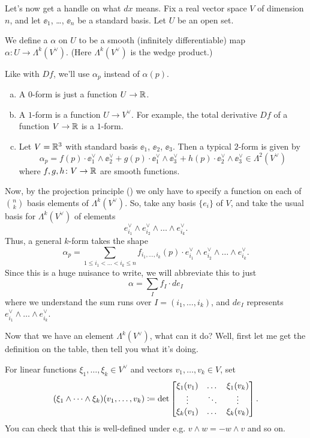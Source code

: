 Let's now get a handle on what $dx$ means.
Fix a real vector space $V$ of dimension $n$,
and let $\ee_1$, \dots, $\ee_n$ be a standard basis.
Let $U$ be an open set.

\begin{definition}
	We define a  $\alpha$ on $U$
	to be a smooth (infinitely differentiable) map
	$\alpha \colon U \to \Lambda^k(V^\vee)$.
	(Here $\Lambda^k(V^\vee)$ is the wedge product.)
\end{definition}

Like with $Df$, we'll use $\alpha_p$ instead of $\alpha(p)$.

\begin{example}
	[$k$-forms for $k=0,1$]
	\listhack
	\begin{enumerate}[(a)]
		\item A $0$-form is just a function $U \to \mathbb R$.
		\item A $1$-form is a function $U \to V^\vee$.
		For example,
		the total derivative $Df$ of a function $V \to \mathbb R$ is a $1$-form.
		\item Let $V = \mathbb R^3$ with standard basis $\ee_1$, $\ee_2$, $\ee_3$.
		Then a typical $2$-form is given by
		\[
			\alpha_p
			=
			f(p) \cdot \ee_1^\vee \wedge \ee_2^\vee
			+ g(p) \cdot \ee_1^\vee \wedge \ee_3^\vee
			+ h(p) \cdot \ee_2^\vee \wedge \ee_3^\vee
			\in \Lambda^2(V^\vee)
		\]
		where $f,g,h \colon V \to \mathbb R$ are smooth functions.
	\end{enumerate}
\end{example}

Now, by the projection principle () we only have to specify
a function on each of $\binom nk$ basis elements of $\Lambda^k(V^\vee)$.
So, take any basis $\{e_i\}$ of $V$, and
take the usual basis for $\Lambda^k(V^\vee)$ of elements
\[ e_{i_1}^\vee \wedge e_{i_2}^\vee \wedge \dots \wedge e_{i_k}^\vee. \]
Thus, a general $k$-form takes the shape
\[ \alpha_p = \sum_{1 \le i_1 < \dots < i_k \le n}
	f_{i_1, \dots, i_k}(p) \cdot
	e_{i_1}^\vee \wedge e_{i_2}^\vee \wedge \dots \wedge e_{i_k}^\vee. \]
Since this is a huge nuisance to write, we will abbreviate this to just
\[ \alpha = \sum_I f_I \cdot de_I \]
where we understand the sum runs over $I = (i_1, \dots, i_k)$,
and $de_I$ represents $e_{i_1}^\vee \wedge \dots \wedge e_{i_k}^\vee$.

Now that we have an element $\Lambda^k(V^\vee)$, what can it do?
Well, first let me get the definition on the table, then tell you what it's doing.
\begin{definition}
	For linear functions $\xi_1, \dots, \xi_k \in V^\vee$
	and vectors $v_1, \dots, v_k \in V$, set
	\[
		(\xi_1 \wedge \dots \wedge \xi_k)(v_1, \dots, v_k)
		\coloneqq
		\det
		\begin{bmatrix}
			\xi_1(v_1) & \dots & \xi_1(v_k) \\
			\vdots & \ddots & \vdots \\
			\xi_k(v_1) & \dots & \xi_k(v_k)
		\end{bmatrix}.
	\]
	You can check that this is well-defined
	under e.g. $v \wedge w = -w \wedge v$ and so on.
\end{definition}


